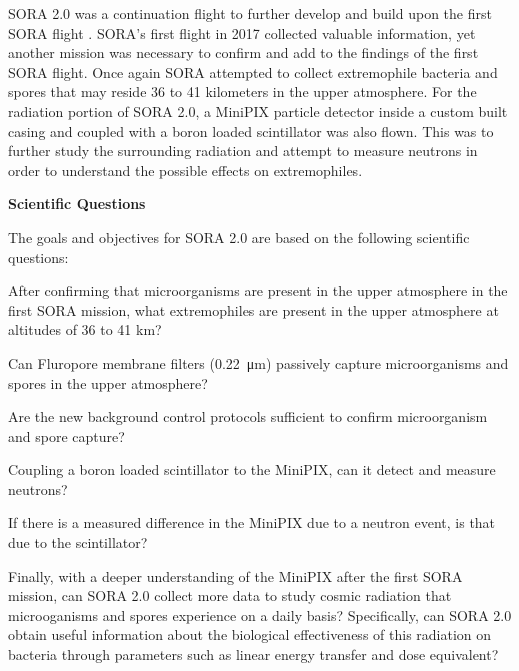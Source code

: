 SORA 2.0 was a continuation flight to further develop and build upon the first SORA flight \cite{SORA}.  SORA's first flight in 2017 collected valuable information, yet another mission was necessary to confirm and add to the findings of the first SORA flight.  Once again SORA attempted to collect extremophile bacteria and spores that may reside 36 to 41 kilometers in the upper atmosphere.  For the radiation portion of SORA 2.0, a MiniPIX particle detector inside a custom built casing and coupled with a boron loaded scintillator was also flown.  This was to further study the surrounding radiation and attempt to measure neutrons in order to understand the possible effects on extremophiles.  
 
{\bf Scientific Questions}

The goals and objectives for SORA 2.0 are based on the following scientific questions: 
%
\begin{itemize}
	{\indentitem \item After confirming that microorganisms are present in the upper atmosphere in the first SORA mission, what extremophiles are present in the upper atmosphere at altitudes of 36 to 41 km?}
	{\indentitem \item Can Fluropore membrane filters (\SI{0.22}{\micro\meter}) passively capture microorganisms and spores in the upper atmosphere?}
	{\indentitem \item Are the new background control protocols sufficient to confirm microorganism and spore capture?} 
	{\indentitem \item Coupling a boron loaded scintillator to the MiniPIX, can it detect and measure neutrons? } 
	{\indentitem \item If there is a measured difference in the MiniPIX due to a neutron event, is that due to the scintillator?}
	{\indentitem \item Finally, with a deeper understanding of the MiniPIX after the first SORA mission, can SORA 2.0 collect more data to study cosmic radiation that microoganisms and spores experience on a daily basis? Specifically, can SORA 2.0 obtain useful information about the biological effectiveness of this radiation on bacteria through parameters such as linear energy transfer and dose equivalent?}
\end{itemize}
%

